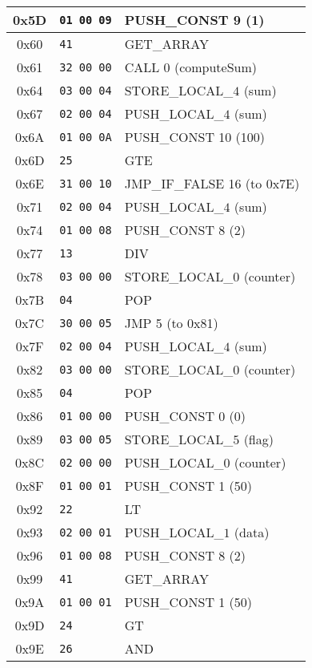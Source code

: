 \documentclass[a4paper,12pt]{article}
\begin{document}
\begin{longtable}{|c|l|p{6cm}|}
  0x5D & \texttt{01 00 09} & PUSH\_CONST 9 (1) \\ \hline
  0x60 & \texttt{41} & GET\_ARRAY \\ \hline
  0x61 & \texttt{32 00 00} & CALL 0 (computeSum) \\ \hline
  0x64 & \texttt{03 00 04} & STORE\_LOCAL\_$4$ (sum) \\ \hline
  0x67 & \texttt{02 00 04} & PUSH\_LOCAL\_$4$ (sum) \\ \hline
  0x6A & \texttt{01 00 0A} & PUSH\_CONST 10 (100) \\ \hline
  0x6D & \texttt{25} & GTE \\ \hline
  0x6E & \texttt{31 00 10} & JMP\_IF\_FALSE 16 (to 0x7E) \\ \hline
  0x71 & \texttt{02 00 04} & PUSH\_LOCAL\_$4$ (sum) \\ \hline
  0x74 & \texttt{01 00 08} & PUSH\_CONST 8 (2) \\ \hline
  0x77 & \texttt{13} & DIV \\ \hline
  0x78 & \texttt{03 00 00} & STORE\_LOCAL\_$0$ (counter) \\ \hline
  0x7B & \texttt{04} & POP \\ \hline
  0x7C & \texttt{30 00 05} & JMP 5 (to 0x81) \\ \hline
  0x7F & \texttt{02 00 04} & PUSH\_LOCAL\_$4$ (sum) \\ \hline
  0x82 & \texttt{03 00 00} & STORE\_LOCAL\_$0$ (counter) \\ \hline
  0x85 & \texttt{04} & POP \\ \hline
  0x86 & \texttt{01 00 00} & PUSH\_CONST 0 (0) \\ \hline
  0x89 & \texttt{03 00 05} & STORE\_LOCAL\_$5$ (flag) \\ \hline
  0x8C & \texttt{02 00 00} & PUSH\_LOCAL\_$0$ (counter) \\ \hline
  0x8F & \texttt{01 00 01} & PUSH\_CONST 1 (50) \\ \hline
  0x92 & \texttt{22} & LT \\ \hline
  0x93 & \texttt{02 00 01} & PUSH\_LOCAL\_$1$ (data) \\ \hline
  0x96 & \texttt{01 00 08} & PUSH\_CONST 8 (2) \\ \hline
  0x99 & \texttt{41} & GET\_ARRAY \\ \hline
  0x9A & \texttt{01 00 01} & PUSH\_CONST 1 (50) \\ \hline
  0x9D & \texttt{24} & GT \\ \hline
  0x9E & \texttt{26} & AND \\ \hline

\end{longtable}
\end{document}
